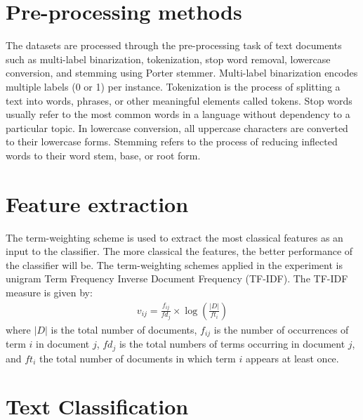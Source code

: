\section{Pre-processing methods}
The datasets are processed through the pre-processing task of text documents such as multi-label binarization, tokenization, stop word removal, lowercase conversion, and stemming using Porter stemmer. Multi-label binarization encodes multiple labels (0 or 1) per instance. Tokenization is the process of splitting a text into words, phrases, or other meaningful elements called tokens. Stop words usually refer to the most common words in a language without dependency to a particular topic. In lowercase conversion, all uppercase characters are converted to their lowercase forms. Stemming refers to the process of reducing inflected words to their word stem, base, or root form.

\section{Feature extraction}
The term-weighting scheme is used to extract the most classical features as an input to the classifier. The more classical the features, the better performance of the classifier will be. The term-weighting schemes applied in the experiment is unigram Term Frequency Inverse Document Frequency (TF-IDF). The TF-IDF measure is given by:
\begin{align*}
\label{tf_idf}
v_{ij} = \frac{f_{ij}}{fd_j} \times \log \left( \frac{|D|}{ft_i} \right)
\end{align*}
where $|D|$ is the total number of documents, $f_{ij}$ is the number of occurrences of term $i$ in document $j$, $fd_j$ is the total numbers of terms occurring in document $j$, and $ft_i$ the total number of documents in which term $i$ appears at least once.

\section{Text Classification}


